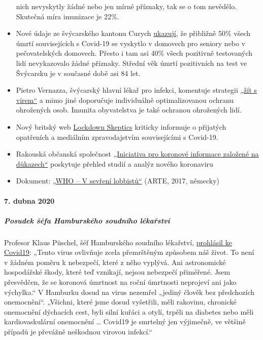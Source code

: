 \begin{itemize}
  nich nevyskytly žádné nebo jen mírné příznaky, tak se o tom nevědělo.
  Skutečná míra imunizace je 22\%.
\item
  Nové údaje ze švýcarského kantonu Curych
  \href{https://www.nzz.ch/zuerich/coronavirus-zuerich-aendert-nun-das-testregime-in-heimenauch-viele-aeltere-covid-19-infizierte-entwickeln-keine-symptome-zuerich-aendert-nun-das-testregime-in-heimen-ld.1552089}{ukazují},
  že přibližně 50\% všech úmrtí souvisejících s Covid-19 se vyskytlo v
  domovech pro seniory nebo v pečovatelských domovech. Přesto i tam asi
  40\% všech pozitivně testovaných lidí nevykazovalo žádné příznaky.
  Střední věk úmrtí pozitivních na test ve Švýcarsku je v současné době
  asi 84 let.
\item
  Pietro Vernazza, švýcarský hlavní lékař pro infekci, komentuje
  strategii
  \href{https://infekt.ch/2020/04/exitstrategie-lockdown/}{„žít s
  virem``} a mimo jiné doporučuje individuálně optimalizovanou ochranu
  ohrožených osob. Imunita obyvatelstva je také ochranou ohrožených
  lidí.
\item
  Nový britský web \href{https://lockdownsceptics.org/}{Lockdown
  Skeptics} kriticky informuje o přijatých opatřeních a mediálním
  zpravodajstvím souvisejícími s Covid-19.
\item
  Rakouská občanská společnost
  \href{https://www.initiative-corona.info/}{„Iniciativa pro koronové
  informace založené na důkazech``} poskytuje přehled studií a analýz
  nového koronaviru
\item
  Dokument: \href{https://www.youtube.com/watch?v=dYlia_fQOLk}{„WHO -- V
  sevření lobbistů``} (ARTE, 2017, německy)
\end{itemize}

\hypertarget{7-dubna-2020}{%
\paragraph{7. dubna 2020}\label{7-dubna-2020}}

\hypertarget{posudek-ux161uxe9fa-hamburskuxe9ho-soudnuxedho-luxe9kaux159stvuxed}{%
\subparagraph{\texorpdfstring{\textbf{Posudek šéfa Hamburského soudního
lékařství}}{Posudek šéfa Hamburského soudního lékařství}}\label{posudek-ux161uxe9fa-hamburskuxe9ho-soudnuxedho-luxe9kaux159stvuxed}}

Profesor Klaus Püschel, šéf Hamburského soudního lékařství,
\href{https://www.pressreader.com/germany/hamburger-morgenpost/20200403/281487868456736}{prohlásil
ke Covid19}: „Tento virus ovlivňuje zcela přemrštěným způsobem náš
život. To není v žádném poměru k nebezpečí, které z něho vyplývá. Ani
astronomické hospodářské škody, které teď vznikají, nejsou nebezpečí
přiměřené. Jsem přesvědčen, že se koronová úmrtnost na roční úmrtnosti
neprojeví ani jako výchylka.`` V Hamburku dosud na virus nezemřel
„jediný člověk bez předchozích onemocnění``. „Všichni, které jsme dosud
vyšetřili, měli rakovinu, chronické onemocnění dýchacích cest, byli
silní kuřáci a otylí, trpěli na diabetes nebo měli kardiovaskulární
onemocnění \ldots{} Covid19 je smrtelný jen výjimečně, ve většině
případů je převážně neškodnou virovou infekcí.``


